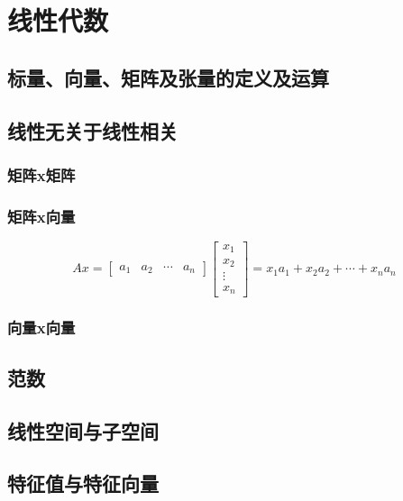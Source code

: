 \chapter{线性代数}

    \section{标量、向量、矩阵及张量的定义及运算}
    \section{线性无关于线性相关}
    \subsection{矩阵x矩阵}

    \subsection{矩阵x向量}
    
    \begin{equation}
    A x=\left[\begin{array}{llll}{a_{1}} & {a_{2}} & {\cdots} & {a_{n}}\end{array}\right]\left[\begin{array}{c}{x_{1}} \\ {x_{2}} \\ {\vdots} \\ {x_{n}}\end{array}\right]=x_{1} a_{1}+x_{2} a_{2}+\cdots+x_{n} a_{n}
    \end{equation}
    
    \subsection{向量x向量}

    \section{范数}
    \section{线性空间与子空间}
    \subsection{}

    \section{特征值与特征向量}
    
